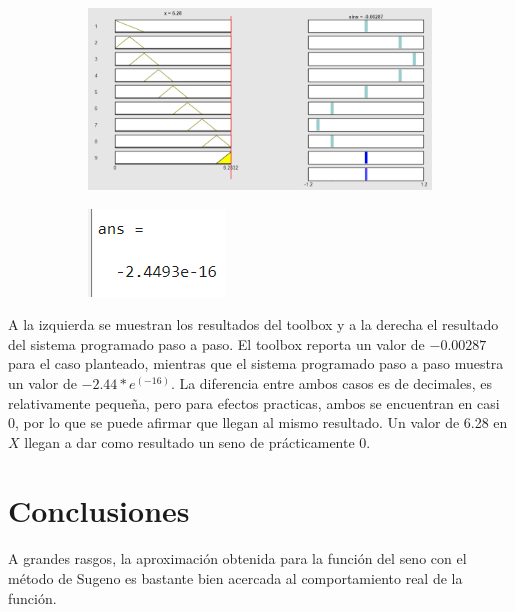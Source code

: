 \documentclass[11pt, letterpaper]{article}
\begin{document}
\begin{figure}[h]
	\centering
	\begin{subfigure}{0.40\textwidth} %
		\centering
		\includegraphics[width=1.4\textwidth]{IMG/RP13.png}
		\label{fig:G7}
	\end{subfigure}
	\hfill
	\begin{subfigure}{0.42\textwidth} %
		\centering
		\includegraphics[width=0.4\textwidth]{IMG/M13.png}
		\label{fig:G8}
	\end{subfigure}
	\label{fig:comparacion4}
\end{figure}

A la izquierda se muestran los resultados del toolbox y a la derecha el resultado del sistema programado paso a paso. El toolbox reporta un valor de $-0.00287$ para el caso planteado, mientras que el sistema programado paso a paso muestra un valor de $-2.44*e^(-16)$. La diferencia entre ambos casos es de decimales, es relativamente pequeña, pero para efectos practicas, ambos se encuentran en casi 0, por lo que se puede afirmar que llegan al mismo resultado. Un valor de 6.28 en $X$ llegan a dar como resultado un seno de prácticamente 0.


\section{Conclusiones}

A grandes rasgos, la aproximación obtenida para la función del seno con el método de Sugeno es bastante bien acercada al comportamiento real de la función.
\end{document}
